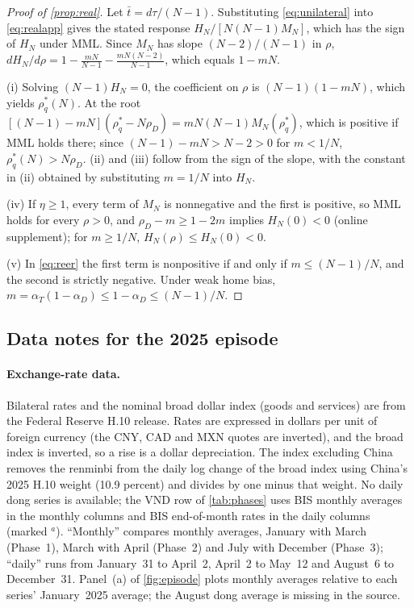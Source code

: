 \begin{proof}[Proof of \cref{prop:real}]
Let $\bar t=d\tau/(N-1)$. Substituting \cref{eq:unilateral} into \cref{eq:realapp} gives the stated response $H_N/[N(N-1)M_N]$, which has the sign of $H_N$ under MML. Since $M_N$ has slope $(N-2)/(N-1)$ in $\rho$, $dH_N/d\rho=1-\frac{mN}{N-1}-\frac{mN(N-2)}{N-1}$, which equals $1-mN$.

(i) Solving $(N-1)H_N=0$, the coefficient on $\rho$ is $(N-1)(1-mN)$, which yields $\rho^*_q(N)$. At the root $[(N-1)-mN](\rho^*_q-N\rho_D)=mN(N-1)M_N(\rho^*_q)$, which is positive if MML holds there; since $(N-1)-mN>N-2>0$ for $m<1/N$, $\rho^*_q(N)>N\rho_D$. (ii) and (iii) follow from the sign of the slope, with the constant in (ii) obtained by substituting $m=1/N$ into $H_N$.

(iv) If $\eta\geq1$, every term of $M_N$ is nonnegative and the first is positive, so MML holds for every $\rho>0$, and $\rho_D-m\geq1-2m$ implies $H_N(0)<0$ (online supplement); for $m\geq1/N$, $H_N(\rho)\leq H_N(0)<0$.

(v) In \cref{eq:reer} the first term is nonpositive if and only if $m\leq(N-1)/N$, and the second is strictly negative. Under weak home bias, $m=\alpha_T(1-\alpha_D)\leq1-\alpha_D\leq(N-1)/N$.
\end{proof}

\subsection{Data notes for the 2025 episode}
\label{app:episode-data}

\paragraph{Exchange-rate data.} Bilateral rates and the nominal broad dollar index (goods and services) are from the Federal Reserve H.10 release. Rates are expressed in dollars per unit of foreign currency (the CNY, CAD and MXN quotes are inverted), and the broad index is inverted, so a rise is a dollar depreciation. The index excluding China removes the renminbi from the daily log change of the broad index using China's 2025 H.10 weight (10.9 percent) and divides by one minus that weight. No daily dong series is available; the VND row of \cref{tab:phases} uses BIS monthly averages in the monthly columns and BIS end-of-month rates in the daily columns (marked $^{a}$). ``Monthly'' compares monthly averages, January with March (Phase~1), March with April (Phase~2) and July with December (Phase~3); ``daily'' runs from January~31 to April~2, April~2 to May~12 and August~6 to December~31. Panel~(a) of \cref{fig:episode} plots monthly averages relative to each series' January~2025 average; the August dong average is missing in the source.


